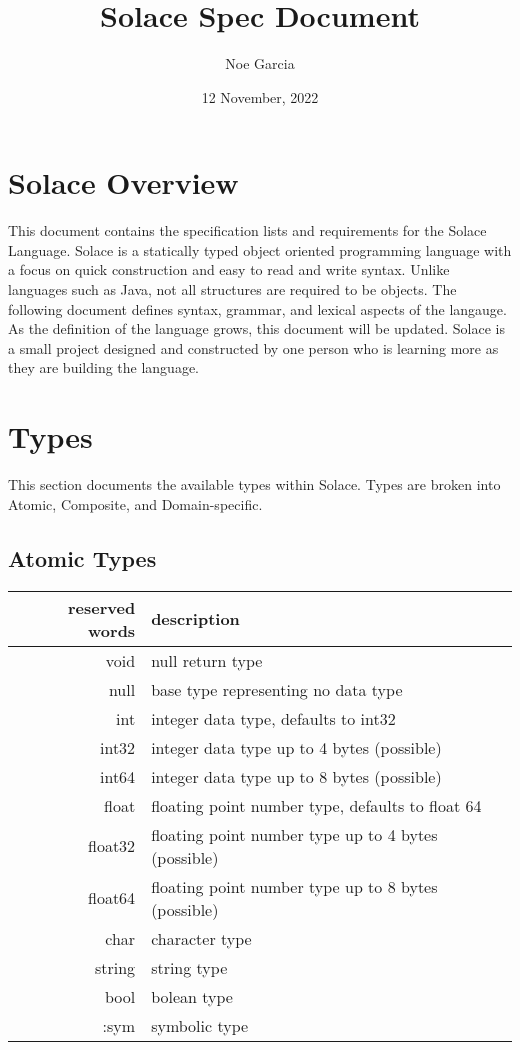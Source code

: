 \documentclass{article}
\title{
	\vspace{2in}
	\textmd{\textbf{Solace Spec Document}}
	\vspace{3in}
}
\author{Noe Garcia}
\date{12 November, 2022}
\begin{document}
\maketitle
\newpage

\section{Solace Overview}
This document contains the specification lists and requirements for the Solace Language.
Solace is a statically typed object oriented programming language with a focus on quick
construction and easy to read and write syntax. Unlike languages such as Java, not all
structures are required to be objects. The following document defines syntax, grammar, and
lexical aspects of the langauge. As the definition of the language grows, this document
will be updated.
Solace is a small project designed and constructed by one person who is learning more
as they are building the language.


\section{Types}
This section documents the available types within Solace. Types are broken into Atomic,
Composite, and Domain-specific.

\subsection{Atomic Types}
\begin{tabular}{r|l}
	reserved words & description \\
	\hline
	\hline
	void & null return type \\
	null & base type representing no data type \\
	int & integer data type, defaults to int32 \\
	int32 & integer data type up to 4 bytes (possible) \\
	int64 & integer data type up to 8 bytes (possible) \\
	float & floating point number type, defaults to float 64 \\
	float32 & floating point number type up to 4 bytes (possible) \\
	float64 & floating point number type up to 8 bytes (possible) \\
	char & character type \\
	string & string type \\
	bool & bolean type \\
	:sym & symbolic type \\
	\hline
\end{tabular}
\end{document}
